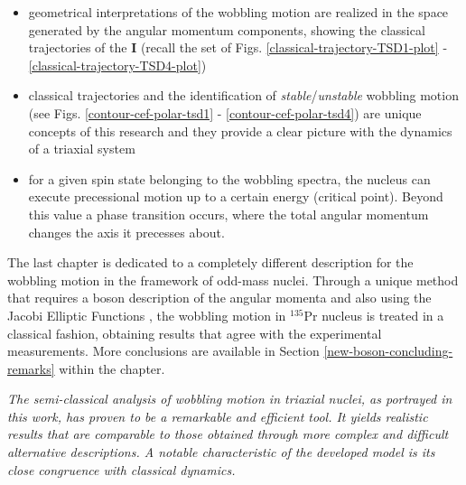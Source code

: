 \begin{itemize}
    \item geometrical interpretations of the wobbling motion are realized in the space generated by the angular momentum components, showing the classical trajectories of the $\mathbf{I}$ (recall the set of Figs. \ref{classical-trajectory-TSD1-plot} - \ref{classical-trajectory-TSD4-plot})
    \item classical trajectories and the identification of \emph{stable}/\emph{unstable} wobbling motion (see Figs. \ref{contour-cef-polar-tsd1} - \ref{contour-cef-polar-tsd4}) are unique concepts of this research and they provide a clear picture with the dynamics of a triaxial system
    \item for a given spin state belonging to the wobbling spectra, the nucleus can execute precessional motion up to a certain energy (critical point). Beyond this value a phase transition occurs, where the total angular momentum changes the axis it precesses about.
\end{itemize}

The last chapter is dedicated to a completely different description for the wobbling motion in the framework of odd-mass nuclei. Through a unique method that requires a boson description of the angular momenta and also using the Jacobi Elliptic Functions \cite{jacobi1829fundamenta}, the wobbling motion in $^{135}$Pr nucleus is treated in a classical fashion, obtaining results that agree with the experimental measurements. More conclusions are available in Section \ref{new-boson-concluding-remarks} within the chapter.

\emph{The semi-classical analysis of wobbling motion in triaxial nuclei, as portrayed in this work, has proven to be a remarkable and efficient tool. It yields realistic results that are comparable to those obtained through more complex and difficult alternative descriptions. A notable characteristic of the developed model is its close congruence with classical dynamics.}

